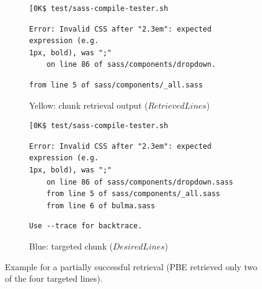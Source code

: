 \begin{figure}[!t]
  \centering
\begin{subfigure}[b]{\columnwidth}
  \begin{lstlisting}[breaklines=true,frame=tlr]
[0K$ test/sass-compile-tester.sh
  \end{lstlisting}
  \vspace{-\baselineskip}
  \begin{lstlisting}[backgroundcolor=\color{Yellow!60},breaklines=true,frame=rl]
Error: Invalid CSS after "2.3em": expected expression (e.g.
1px, bold), was ";"
	on line 86 of sass/components/dropdown.
  \end{lstlisting}
  \vspace{-\baselineskip}
  \begin{lstlisting}[breaklines=true,frame=blr]
	from line 5 of sass/components/_all.sass
  \end{lstlisting}
	\caption{Yellow: chunk retrieval output ($RetrievedLines$)}
	\label{lst:pbe-part-success-output}
\end{subfigure}

\begin{subfigure}[b]{\columnwidth}
  \begin{lstlisting}[breaklines=true,frame=tlr]
[0K$ test/sass-compile-tester.sh
  \end{lstlisting}
  \vspace{-\baselineskip}
  \begin{lstlisting}[backgroundcolor=\color{Cerulean!60},breaklines=true,frame=rl]
Error: Invalid CSS after "2.3em": expected expression (e.g.
1px, bold), was ";"
	on line 86 of sass/components/dropdown.sass
	from line 5 of sass/components/_all.sass
	from line 6 of bulma.sass
  \end{lstlisting}
  \vspace{-\baselineskip}
  \begin{lstlisting}[breaklines=true,frame=blr]
  Use --trace for backtrace.
  \end{lstlisting}
	\caption{Blue: targeted chunk ($DesiredLines$)}
	\label{lst:pbe-part-success-desired}
\end{subfigure}
  \caption{Example for a partially successful retrieval
  (PBE retrieved only
  two of the four targeted lines).}
  \label{lst:pbe-unsuccessful}
\end{figure}


